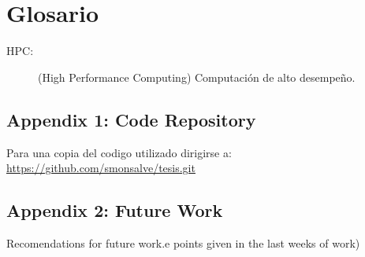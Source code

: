 \documentclass[twoside,letterpaper,12pt]{report}
\begin{document}
\chapter{Glosario}
\label{chapGlosario}

\begin{description}
	\item[HPC:] (High Performance Computing) Computación de alto desempeño.
\end{description}

\newpage



	



\newpage

\appendix
\section{Appendix 1: Code Repository}

	Para una copia del codigo utilizado dirigirse a:
	\url{https://github.com/smonsalve/tesis.git}

\appendix
\section{Appendix 2: Future Work}

	Recomendations for future work.e points given in the last weeks of work)  
\end{document}
